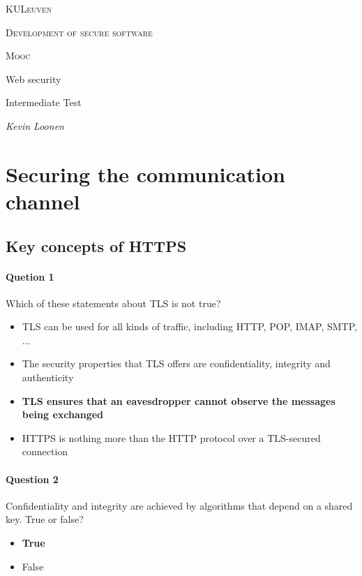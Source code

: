 \documentclass[titlepage]{article}
\begin{document}
    \begin{titlepage}
        \centering
        {\scshape\large KULeuven \par}
        \vspace{0.5cm}
        {\scshape\Large Development of secure software\par}
        \vspace{2cm}
        {\scshape\Large Mooc\par}
        {\Large Web security\par}
        {\Large Intermediate Test\par}
        \vspace{10cm}
        {\Large\itshape Kevin Loonen\par}
    \end{titlepage}
    \section{Securing the communication channel}
    \subsection{Key concepts of HTTPS}
    \paragraph{Quetion 1} Which of these statements about TLS is not true?
    \begin{itemize}
        \item TLS can be used for all kinds of traffic, including HTTP, POP, IMAP, SMTP, ...
        \item The security properties that TLS offers are confidentiality, integrity and authenticity
        \item \textbf{TLS ensures that an eavesdropper cannot observe the messages being exchanged} \checkmark
        \item HTTPS is nothing more than the HTTP protocol over a TLS-secured connection
    \end{itemize}
    \paragraph{Question 2} Confidentiality and integrity are achieved by algorithms that depend on a shared key. True or false?
    \begin{itemize}
        \item \textbf{True} \checkmark
        \item False
    \end{itemize}
\end{document}
